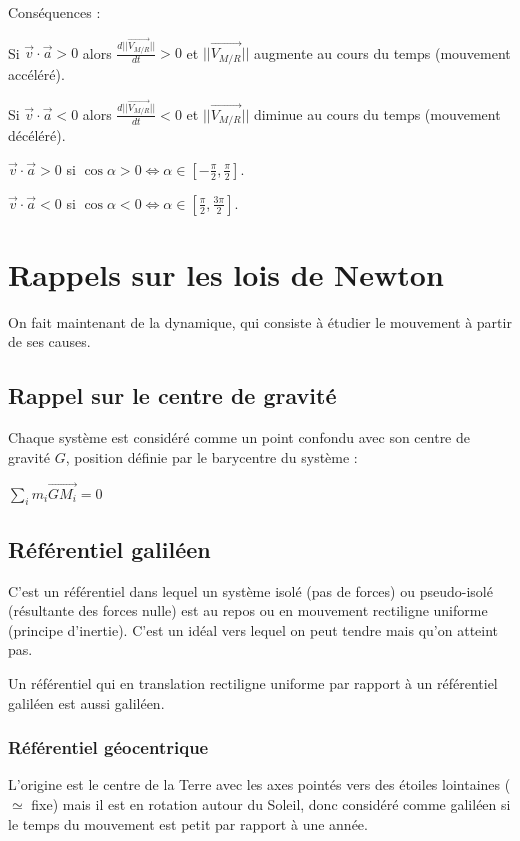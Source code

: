 \documentclass[french]{yLectureNote}
\renewcommand{\vec}{\overrightarrow}
\newcommand{\norm}[1]{||\vec{#1}||}
\begin{document}
Conséquences :

Si $\vec{v}\cdot\vec{a} > 0$ alors $\frac{d\norm{V_{M/R}}}{dt} > 0$ et $\norm{V_{M/R}}$ augmente au cours du temps (mouvement accéléré).

Si $\vec{v}\cdot\vec{a} < 0$ alors $\frac{d\norm{V_{M/R}}}{dt} < 0$ et $\norm{V_{M/R}}$ diminue au cours du temps (mouvement décéléré).

$\vec{v}\cdot\vec{a} > 0$ si $\cos \alpha > 0 \iff \alpha \in [-\frac{\pi}{2},\frac{\pi}{2}]$.

$\vec{v}\cdot\vec{a} < 0$ si $\cos \alpha < 0 \iff \alpha \in [\frac{\pi}{2},\frac{3\pi}{2}]$.
\section{Rappels sur les lois de Newton}

On fait maintenant de la dynamique, qui consiste à étudier le mouvement à partir de ses causes.
\subsection{Rappel sur le centre de gravité}
Chaque système est considéré comme un point confondu avec son centre de gravité $G$, position définie par le barycentre du système :
\begin{theorem}
$\displaystyle \sum_i m_i\vec{GM_i} = 0$
\end{theorem}
\subsection{Référentiel galiléen}
C'est un référentiel dans lequel un système isolé (pas de forces) ou pseudo-isolé (résultante des forces nulle) est au repos ou en mouvement rectiligne uniforme (principe d'inertie). C'est un idéal vers lequel on peut tendre mais qu'on atteint pas.

Un référentiel qui en translation rectiligne uniforme par rapport à un référentiel galiléen est aussi galiléen.
\subsubsection{Référentiel géocentrique}
L'origine est le centre de la Terre avec les axes pointés vers des étoiles lointaines ($\simeq$ fixe) mais il est en rotation autour du Soleil, donc considéré comme galiléen si le temps du mouvement est petit par rapport à une année.
\end{document}
